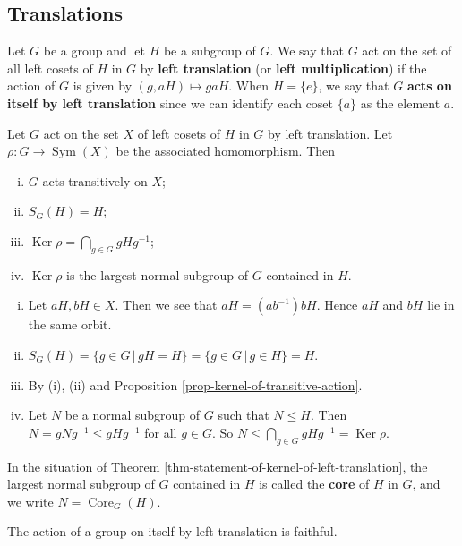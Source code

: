 \subsection{Translations}
\begin{definition}
	Let $G$ be a group and let $H$ be a subgroup of $G$. We say that $G$ act on the set of all left cosets of $H$ in $G$ by \textbf{left translation} (or \textbf{left multiplication}) if the action of $G$ is given by $(g,aH) \mapsto gaH$. When $H = \{e\}$, we say that $G$ \textbf{acts on itself by left translation} since we can identify each coset $\{a\}$ as the element $a$.
\end{definition}
\begin{theorem} \label{thm-statement-of-kernel-of-left-translation}
	Let $G$ act on the set $X$ of left cosets of $H$ in $G$ by left translation. Let $\rho:G\rightarrow \operatorname{Sym}(X)$ be the associated homomorphism. Then
	\begin{enumerate}[(i)]
		\item $G$ acts transitively on $X$;
		\item $S_G(H) = H$;
		\item $\operatorname{Ker} \rho  = \bigcap_{g\in G} gHg^{-1}$;
		\item $\operatorname{Ker} \rho$ is the largest normal subgroup of $G$ contained in $H$.
	\end{enumerate}
\end{theorem}
\begin{sketch}
	\begin{enumerate}[(i)]
		\item Let $aH,bH\in X$. Then we see that $aH= (ab^{-1})bH$. Hence $aH$ and $bH$ lie in the same orbit.
		\item $S_{G}(H) = \{g\in G\,|\, gH = H\} = \{g\in G\,|\, g\in H\} = H$.
		\item By (i), (ii) and Proposition \ref{prop-kernel-of-transitive-action}.
		\item Let $N$ be a normal subgroup of $G$ such that $N\leq H$. Then $N = gNg^{-1}\leq gHg^{-1}$ for all $g\in G$. So $N\leq \bigcap_{g\in G} gHg^{-1} = \operatorname{Ker}\rho$. \qedhere
	\end{enumerate}
\end{sketch}
In the situation of Theorem \ref{thm-statement-of-kernel-of-left-translation}, the largest normal subgroup of $G$ contained in $H$ is called the \textbf{core} of $H$ in $G$, and we write $N = \operatorname{Core}_G(H)$. 
\begin{corollary}\label{cor-action-on-itself-by-trans-is-faithful}
	The action of a group on itself by left translation is faithful.
\end{corollary}
